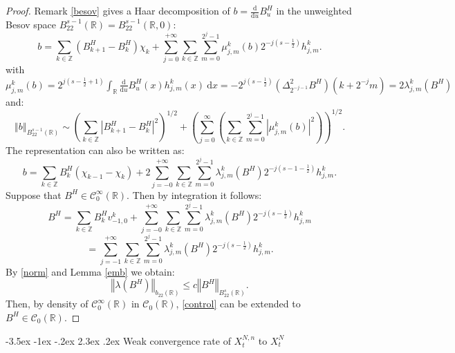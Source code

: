 \documentclass[11pt]{article}
\makeatletter
\renewcommand\section{\@startsection {section}{1}{\z@}%
    {-3.5ex \@plus -1ex \@minus -.2ex}%
    {2.3ex \@plus.2ex}%
    {\centering\large\scshape\bfseries}}
\newcommand{\de}[2]{\frac{\mathrm{d} #1}{\mathrm{d} #2}}
\newcommand{\norme}[1]{\left\Vert #1\right\Vert}
\newcommand{\R}{\mathbb{R}}
\newcommand{\Z}{\mathbb{Z}}
\newcommand{\di}{\mathrm{d}}
\makeatother
\begin{document}
\begin{proof}
    Remark \ref{besov} gives a Haar decomposition of $b=\de{}{u} B^H_u$ in the unweighted Besov space $B^{s-1}_{22}(\R)=B^{s-1}_{22}(\R,0)$:
    \begin{equation}
    b =\sum_{k\in\Z}\left(B^H_{k+1}-B^H_k\right)\chi_k +\sum_{j=0}^{+\infty}\sum_{k\in\Z}\sum_{m=0}^{2^j-1}\mu_{j,m}^k(b)2^{-j\left(s-\frac{1}{2}\right)}h_{j,m}^k.
    \end{equation}
    with $\mu^k_{j,m}(b)= 2^{j\left(s-\frac{1}{2}+1\right)}\int_{\R}\de{}{u} B^H_u(x)h_{j,m}^k(x)\ \di x=-2^{j\left(s-\frac{1}{2}\right)} \left(\Delta^2_{2^{-j-1}}B^H\right)(k+2^{-j}m)=2\lambda^k_{j,m}(B^H)$ and:
    \begin{equation}\label{norm}
    \norme{b}_{B^{s-1}_{22}(\R)} \sim \left(\sum_{k\in\Z}\left|B^H_{k+1}-B^H_k\right|^2\right)^{1/2} + \left(\sum_{j=0}^\infty\left(\sum_{k\in\Z}\sum_{m=0}^{2^j-1}\left|\mu_{j,m}^k(b)\right|^2\right)\right)^{1/2}.
    \end{equation}    
    The representation can also be written as:
    \begin{equation*}
    b = \sum_{k\in\Z} B^H_k(\chi_{k-1}-\chi_k) + 2\sum_{j=-0}^{+\infty}\sum_{k\in\Z}\sum_{m=0}^{2^j-1}\lambda_{j,m}^k\left(B^H\right)2^{-j\left(s-1-\frac{1}{2}\right)}h_{j,m}^k.
    \end{equation*}
    Suppose that $B^H\in\mathcal{C}^\infty_0(\R)$. Then by integration it follows:
    \begin{equation*}
    B^H = \sum_{k\in\Z} B^H_k v^k_{-1,0} + \sum_{j=-0}^{+\infty}\sum_{k\in\Z}\sum_{m=0}^{2^j-1}\lambda_{j,m}^k\left(B^H\right)2^{-j\left(s-\frac{1}{2}\right)}h_{j,m}^k
    \end{equation*}
    \begin{equation}\label{rep}
    =\sum_{j=-1}^{+\infty}\sum_{k\in\Z}\sum_{m=0}^{2^j-1}\lambda_{j,m}^k\left(B^H\right)2^{-j\left(s-\frac{1}{2}\right)}h_{j,m}^k.
    \end{equation}    
    By \ref{norm} and Lemma \ref{emb} we obtain:
    \begin{equation}\label{control}
    \norme{\lambda(B^H)}_{b_{22}(\R)} \leq c\norme{B^H}_{B^s_{22}(\R)}.
    \end{equation}
    Then, by density of $\mathcal{C}^\infty_0(\R)$ in $\mathcal{C}_0
    (\R)$, \ref{control} can be extended to $B^H\in\mathcal{C}_0
    (\R)$. 
    
\end{proof}

\section{Weak convergence rate of $X_t^{N,n}$ to $X_t^N$}
\end{document}
